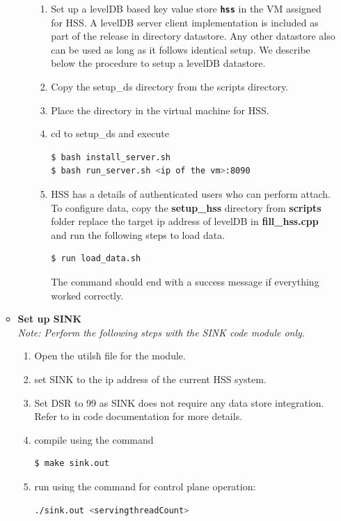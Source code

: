 \pdfminorversion=4\documentclass[hidelinks]{report}
\newcommand{\cf}[1] {
	\textbf{\texttt{#1}}
}
\begin{document}
\begin{enumerate}
\begin{itemize}
\begin{enumerate}
\begin{enumerate}
\item Set up a levelDB based key value store \cf{hss} in the VM assigned for HSS.
A levelDB server client implementation is included as part of the release in directory datastore. Any other datastore also can be used as long as it follows identical setup. We describe below the procedure to setup a levelDB datastore. 
\item Copy the setup\_ds directory from the scripts directory.
\item Place the directory in the virtual machine for HSS. 
\item cd to setup\_ds and execute 
\begin{lstlisting}[language=bash]
$ bash install_server.sh
$ bash run_server.sh <ip of the vm>:8090
\end{lstlisting}

\item HSS has a details of authenticated users who can perform attach. To configure data, copy the \textbf{setup\_hss} directory from \textbf{scripts} folder replace the target ip address of levelDB in \textbf{fill\_hss.cpp} and run the following steps to load data. 
\begin{lstlisting}[language=bash]
$ run load_data.sh
\end{lstlisting}
The command should end with a success message if everything worked correctly.
\end{enumerate}

\end{enumerate}
\item \textbf{Set up SINK}\\

\textit{Note: Perform the following steps with the SINK code module only.}
\begin{enumerate}

\item Open the utils\.h file for the module.
\item set SINK to the ip address of the current HSS system.
\item Set DSR to 99 as SINK does not require any data store integration. Refer to in code documentation for more details.
\item compile using the command 
\begin{lstlisting}[language=bash]
$ make sink.out
\end{lstlisting}
\item run using the command for control plane operation:
\begin{lstlisting}[language=bash]
./sink.out <servingthreadCount> 
\end{lstlisting}

\end{enumerate}\end{itemize}

\end{enumerate}
\end{document}
